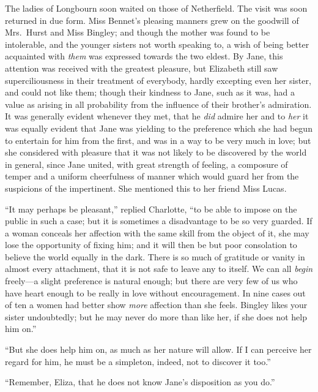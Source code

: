 \documentclass[12pt,english,oneside]{book}
\begin{document}


The ladies of Longbourn soon waited on those of Netherfield. The visit
was soon returned in due form. Miss Bennet's pleasing manners grew
on the goodwill of Mrs.\ Hurst and Miss Bingley; and though the mother
was found to be intolerable, and the younger sisters not worth speaking
to, a wish of being better acquainted with \textit{them} was expressed
towards the two eldest. By Jane, this attention was received with
the greatest pleasure, but Elizabeth still saw superciliousness in
their treatment of everybody, hardly excepting even her sister, and
could not like them; though their kindness to Jane, such as it was,
had a value as arising in all probability from the influence of their
brother's admiration. It was generally evident whenever they met,
that he \textit{did} admire her and to \textit{her} it was equally
evident that Jane was yielding to the preference which she had begun
to entertain for him from the first, and was in a way to be very much
in love; but she considered with pleasure that it was not likely to
be discovered by the world in general, since Jane united, with great
strength of feeling, a composure of temper and a uniform cheerfulness
of manner which would guard her from the suspicions of the impertinent.
She mentioned this to her friend Miss Lucas.

{}``It may perhaps be pleasant,'' replied Charlotte, {}``to be
able to impose on the public in such a case; but it is sometimes a
disadvantage to be so very guarded. If a woman conceals her affection
with the same skill from the object of it, she may lose the opportunity
of fixing him; and it will then be but poor consolation to believe
the world equally in the dark. There is so much of gratitude or vanity
in almost every attachment, that it is not safe to leave any to itself.
We can all \textit{begin} freely\mbox{---}a slight preference is
natural enough; but there are very few of us who have heart enough
to be really in love without encouragement. In nine cases out of ten
a women had better show \textit{more} affection than she feels. Bingley
likes your sister undoubtedly; but he may never do more than like
her, if she does not help him on.''

{}``But she does help him on, as much as her nature will allow. If
I can perceive her regard for him, he must be a simpleton, indeed,
not to discover it too.''

{}``Remember, Eliza, that he does not know Jane's disposition as
you do.''
\end{document}

